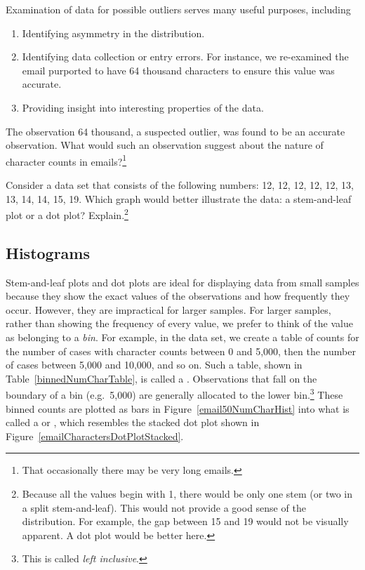 \begin{tipBox}{
Examination of data for possible outliers serves many useful purposes, including\vspace{-2mm}
\begin{enumerate}
\setlength{\itemsep}{0mm}
\item Identifying asymmetry in the distribution.
\item Identifying data collection or entry errors. For instance, we re-examined the email purported to have 64 thousand characters to ensure this value was accurate.
\item Providing insight into interesting properties of the data.\vspace{0.5mm}
\end{enumerate}}
\end{tipBox}

\begin{exercise}
The observation 64 thousand, a suspected outlier, was found to be an accurate observation. What would such an observation suggest about the nature of character counts in emails?\footnote{That occasionally there may be very long emails.}\end{exercise}

\begin{exercise}
Consider a data set that consists of the following numbers:  12, 12, 12, 12, 12, 13, 13, 14, 14, 15, 19. Which graph would better illustrate the data: a stem-and-leaf plot or a dot plot? Explain.\footnote{Because all the values begin with 1, there would be only one stem (or two in a split stem-and-leaf). This would not provide a good sense of the distribution. For example, the gap between 15 and 19 would not be visually apparent. A dot plot would be better here.}
\end{exercise}


\subsection{Histograms}
\label{histogramsAndShape}

Stem-and-leaf plots and dot plots are ideal for displaying data from small samples because they show the exact values of the observations and how frequently they occur. However, they are impractical for larger samples. For larger samples, rather than showing the frequency of every value, we prefer to think of the value as belonging to a \emph{bin}. For example, in the  data set, we create a table of counts for the number of cases with character counts between 0 and 5,000, then the number of cases between 5,000 and 10,000, and so on. Such a table, shown in Table~\ref{binnedNumCharTable}, is called a . Observations that fall on the boundary of a bin (e.g.~5,000) are generally allocated to the lower bin.\footnote{This is called \emph{left inclusive}.} These binned counts are plotted as bars in Figure~\ref{email50NumCharHist} into what is called a  or , which resembles the stacked dot plot shown in Figure~\ref{emailCharactersDotPlotStacked}.

